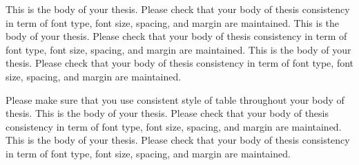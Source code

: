 This is the body of your thesis. Please check that your body of thesis consistency in term of font type, font size, spacing, and margin are maintained. This is the body of your thesis. Please check that your body of thesis consistency in term of font type, font size, spacing, and margin are maintained. This is the body of your thesis. Please check that your body of thesis consistency in term of font type, font size, spacing, and margin are maintained.

Please make sure that you use consistent style of table throughout your body of thesis. This is the body of your thesis. Please check that your body of thesis consistency in term of font type, font size, spacing, and margin are maintained. This is the body of your thesis. Please check that your body of thesis consistency in term of font type, font size, spacing, and margin are maintained.
